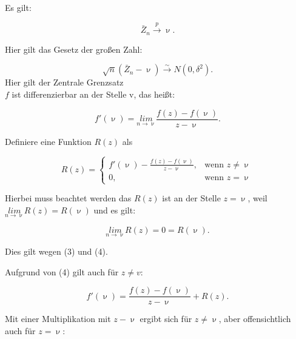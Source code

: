 \documentclass[10pt]{article}
\newcommand{\KW}{\overset{p} \longrightarrow} %
\newcommand{\KV}{\overset{\sim} \longrightarrow} %
\newcommand{\eqname}[1]{\tag*{#1}}%
\newenvironment{BWS}[1][]
{\begin{Beweis}[frametitle=#1]}{\end{Beweis}}
\begin{document}
	
	\begin{BWS}[Beweis 1.1 Delta-Methode]
		Es gilt:
		
		
		\begin{equation*}
			\bar{Z}_n \KW \upnu  \eqname{(1)}.
		\end{equation*}
		
		\noindent Hier gilt das Gesetz der großen Zahl:
		
		\begin{equation*}
			\sqrt{n} (\bar{Z}_n - \upnu) \KV N(0,\delta^2) \eqname{(2)}.
		\end{equation*}
		Hier gilt der Zentrale Grenzsatz\\
		
	\noindent	$f$ ist differenzierbar an der Stelle v, das heißt: 
		
		\begin{equation*}
			f'(\upnu) = \underset{n \rightarrow \upnu}{lim} \frac{f(z) - f(\upnu)}{z-\upnu} \eqname{(3)}.
		\end{equation*}
		
		\noindent Definiere eine Funktion $R(z)$ als
		
		\begin{equation*}
			R(z) = \begin{cases} 
				f'(\upnu) - \frac{f(z)- f(\upnu)}{z-\upnu}, &\text{wenn } z \neq \upnu\\
				0, &\text{wenn } z = \upnu
			\end{cases} \eqname{(4)}
		\end{equation*}
		
		\noindent Hierbei muss beachtet werden das $R(z)$ ist an der Stelle $z=\upnu$, weil $\underset{n \rightarrow \upnu} {lim} R(z) = R(\upnu)$ und es gilt:
		
		\begin{equation*}
			\underset{n \rightarrow \upnu} {lim} R(z) = 0 = R(\upnu).
		\end{equation*}
		
		\noindent Dies gilt wegen (3) und (4).
		
		\noindent Aufgrund von (4) gilt auch für $z \neq v$:
		
		\begin{equation*}
			f'(\upnu)=\frac{f(z) - f(\upnu)}{z - \upnu} + R(z).
		\end{equation*}
		
		Mit einer Multiplikation mit $z-\upnu$ ergibt sich für $z \neq \upnu$, aber offensichtlich auch für $z = \upnu$:
		

\end{BWS}
\end{document}
